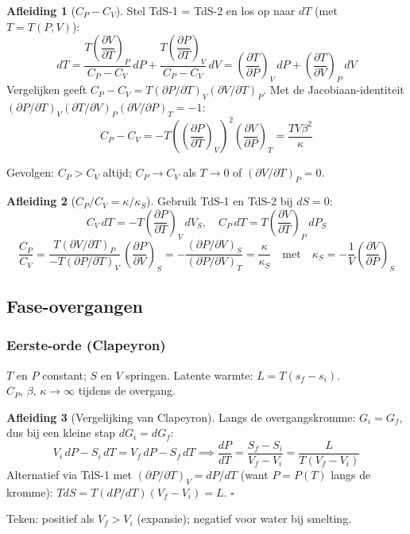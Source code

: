 \documentclass[a4paper,twoside,10pt]{article}
\theoremstyle{definition}
\newtheorem{derivation}{Afleiding}[section]
\newcommand{\pd}[3][]{\left(\dfrac{\partial #2}{\partial #3}\right)_{\!#1}}
\begin{document}
\begin{derivation}[$C_P - C_V$]
Stel TdS-1 = TdS-2 en los op naar $dT$ (met $T=T(P,V)$):
\[
  dT = \frac{T\pd[P]{V}{T}}{C_P-C_V}\,dP + \frac{T\pd[V]{P}{T}}{C_P-C_V}\,dV
  = \pd[V]{T}{P}\,dP + \pd[P]{T}{V}\,dV
\]
Vergelijken geeft $C_P - C_V = T(\partial P/\partial T)_V(\partial V/\partial T)_P$.
Met de Jacobiaan-identiteit $(\partial P/\partial T)_V(\partial T/\partial V)_P(\partial V/\partial P)_T = -1$:
\[
  \boxed{C_P - C_V = -T\!\left(\pd[V]{P}{T}\right)^{\!2}\!\pd[T]{V}{P} = \frac{TV\beta^2}{\kappa}}
\]
\end{derivation}

Gevolgen: $C_P > C_V$ altijd; $C_P \to C_V$ als $T\to 0$ of $(\partial V/\partial T)_P = 0$.

\begin{derivation}[$C_P/C_V = \kappa/\kappa_S$]
Gebruik TdS-1 en TdS-2 bij $dS=0$:
\[
  C_V\,dT = -T\pd[V]{P}{T}\,dV_S, \quad C_P\,dT = T\pd[P]{V}{T}\,dP_S
\]
\[
  \frac{C_P}{C_V}
  = \frac{T(\partial V/\partial T)_P}{-T(\partial P/\partial T)_V}\,\pd[S]{P}{V}
  = -\frac{(\partial P/\partial V)_S}{(\partial P/\partial V)_T}
  = \boxed{\frac{\kappa}{\kappa_S}}
  \quad\text{met}\quad \kappa_S = -\frac{1}{V}\pd[S]{V}{P}
\]
\end{derivation}

\subsection{Fase-overgangen}

\subsubsection*{Eerste-orde (Clapeyron)}

$T$ en $P$ constant; $S$ en $V$ springen. Latente warmte: $L = T(s_f-s_i)$.
$C_P,\,\beta,\,\kappa \to \infty$ tijdens de overgang.

\begin{derivation}[Vergelijking van Clapeyron]
Langs de overgangskromme: $G_i = G_f$, dus bij een kleine stap $dG_i = dG_f$:
\[
  V_i\,dP - S_i\,dT = V_f\,dP - S_f\,dT
  \implies
  \boxed{\frac{dP}{dT} = \frac{S_f-S_i}{V_f-V_i} = \frac{L}{T(V_f-V_i)}}
\]
Alternatief via TdS-1 met $(\partial P/\partial T)_V = dP/dT$ (want $P=P(T)$ langs de kromme):
$TdS = T(dP/dT)(V_f-V_i) = L$. \hfill$\square$
\end{derivation}

Teken: positief als $V_f > V_i$ (expansie); negatief voor water bij smelting.
\end{document}

